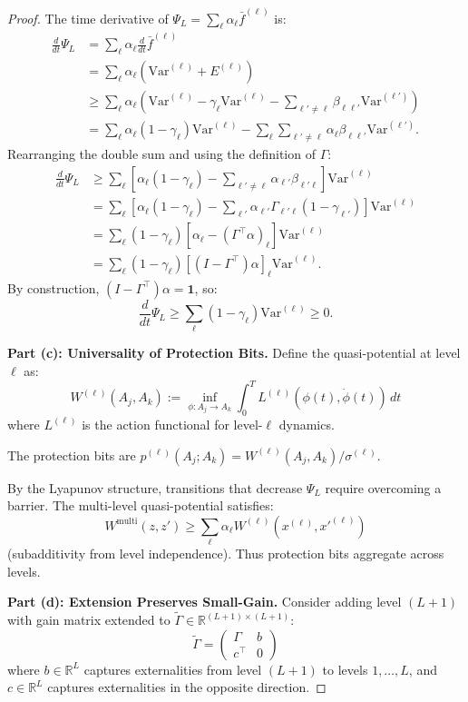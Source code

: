 \documentclass[12pt]{article}
\newcommand{\R}{\mathbb{R}}
\newcommand{\Var}{\mathrm{Var}}
\begin{document}
\begin{proof}
The time derivative of $\Psi_L = \sum_\ell \alpha_\ell \bar{f}^{(\ell)}$ is:
\begin{align*}
\frac{d}{dt} \Psi_L &= \sum_\ell \alpha_\ell \frac{d}{dt} \bar{f}^{(\ell)} \\
&= \sum_\ell \alpha_\ell \left( \Var^{(\ell)} + E^{(\ell)} \right) \\
&\geq \sum_\ell \alpha_\ell \left( \Var^{(\ell)} - \gamma_\ell \Var^{(\ell)} - \sum_{\ell' \neq \ell} \beta_{\ell\ell'} \Var^{(\ell')} \right) \\
&= \sum_\ell \alpha_\ell (1 - \gamma_\ell) \Var^{(\ell)} - \sum_\ell \sum_{\ell' \neq \ell} \alpha_\ell \beta_{\ell\ell'} \Var^{(\ell')}.
\end{align*}
Rearranging the double sum and using the definition of $\Gamma$:
\begin{align*}
\frac{d}{dt} \Psi_L &\geq \sum_\ell \left[ \alpha_\ell (1 - \gamma_\ell) - \sum_{\ell' \neq \ell} \alpha_{\ell'} \beta_{\ell'\ell} \right] \Var^{(\ell)} \\
&= \sum_\ell \left[ \alpha_\ell (1 - \gamma_\ell) - \sum_{\ell'} \alpha_{\ell'} \Gamma_{\ell'\ell} (1 - \gamma_{\ell'}) \right] \Var^{(\ell)} \\
&= \sum_\ell (1 - \gamma_\ell) \left[ \alpha_\ell - (\Gamma^\top \alpha)_\ell \right] \Var^{(\ell)} \\
&= \sum_\ell (1 - \gamma_\ell) \left[ (I - \Gamma^\top) \alpha \right]_\ell \Var^{(\ell)}.
\end{align*}
By construction, $(I - \Gamma^\top) \alpha = \mathbf{1}$, so:
\[
\frac{d}{dt} \Psi_L \geq \sum_\ell (1 - \gamma_\ell) \Var^{(\ell)} \geq 0.
\]

\textbf{Part (c): Universality of Protection Bits.}
Define the quasi-potential at level $\ell$ as:
\[
W^{(\ell)}(A_j, A_k) := \inf_{\phi: A_j \to A_k} \int_0^T L^{(\ell)}(\phi(t), \dot{\phi}(t)) \, dt
\]
where $L^{(\ell)}$ is the action functional for level-$\ell$ dynamics.

The protection bits are $p^{(\ell)}(A_j; A_k) = W^{(\ell)}(A_j, A_k) / \sigma^{(\ell)}$.

By the Lyapunov structure, transitions that decrease $\Psi_L$ require overcoming a barrier. The multi-level quasi-potential satisfies:
\[
W^{\text{multi}}(z, z') \geq \sum_\ell \alpha_\ell W^{(\ell)}(x^{(\ell)}, x'^{(\ell)})
\]
(subadditivity from level independence). Thus protection bits aggregate across levels.

\textbf{Part (d): Extension Preserves Small-Gain.}
Consider adding level $(L + 1)$ with gain matrix extended to $\tilde{\Gamma} \in \R^{(L+1) \times (L+1)}$:
\[
\tilde{\Gamma} = \begin{pmatrix} \Gamma & b \\ c^\top & 0 \end{pmatrix}
\]
where $b \in \R^L$ captures externalities from level $(L+1)$ to levels $1, \ldots, L$, and $c \in \R^L$ captures externalities in the opposite direction.


\end{proof}
\end{document}
